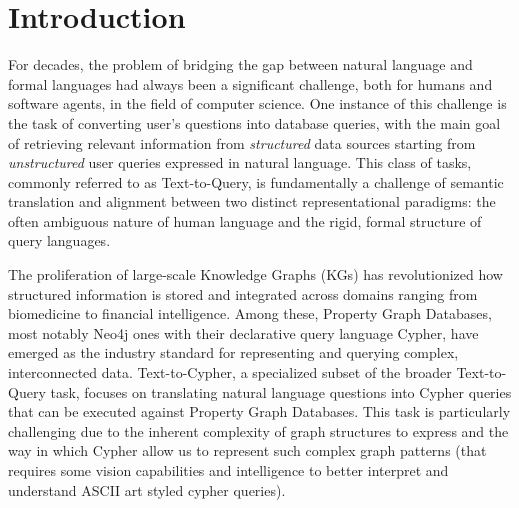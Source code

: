 \section{Introduction}
\label{sec:introduction}

For decades, the problem of bridging the gap between natural language and formal languages had always been a significant challenge, both for humans and software agents, in the field of computer science. One instance of this challenge is the task of converting user's questions into database queries, with the main goal of retrieving relevant information from \textit{structured} data sources starting from \textit{unstructured} user queries expressed in natural language. This class of tasks, commonly referred to as Text-to-Query, is fundamentally a challenge of semantic translation and alignment between two distinct representational paradigms: the often ambiguous nature of human language and the rigid, formal structure of query languages.

The proliferation of large-scale Knowledge Graphs (KGs) has revolutionized how structured information is stored and integrated across domains ranging from biomedicine to financial intelligence. Among these, Property Graph Databases, most notably Neo4j ones with their declarative query language Cypher, have emerged as the industry standard for representing and querying complex, interconnected data. Text-to-Cypher, a specialized subset of the broader Text-to-Query task, focuses on translating natural language questions into Cypher queries that can be executed against Property Graph Databases. This task is particularly challenging due to the inherent complexity of graph structures to express and the way in which Cypher allow us to represent such complex graph patterns (that requires some vision capabilities and intelligence to better interpret and understand ASCII art styled cypher queries). 

